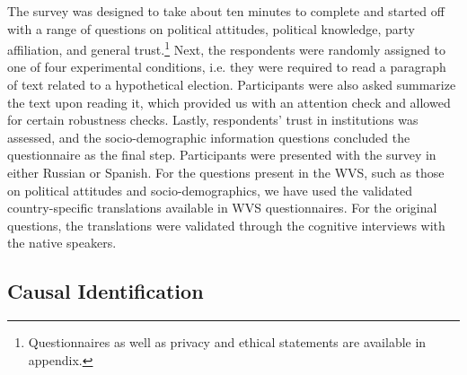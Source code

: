 \documentclass[11pt, ngerman,english,a4]{article}
\begin{document}
The survey was designed to take about ten minutes to complete and started off with a range of questions on political attitudes, political knowledge, party affiliation, and general trust.\footnote{Questionnaires as well as privacy and ethical statements are available in appendix.} 
Next, the respondents were randomly assigned to one of four experimental conditions, i.e. they were required to read a paragraph of text related to a hypothetical election. 
Participants were also asked summarize the text upon reading it, which provided us with an attention check and allowed for certain robustness checks.  
Lastly, respondents' trust in institutions was assessed, and the socio-demographic information questions concluded the questionnaire as the final step.
Participants were presented with the survey in either Russian or Spanish. For the questions present in the WVS, such as those on political attitudes and socio-demographics, we have used the validated country-specific translations available in WVS questionnaires. 
For the original questions, the translations were validated through the cognitive interviews with the native speakers. 


\subsection*{Causal Identification}
\end{document}

